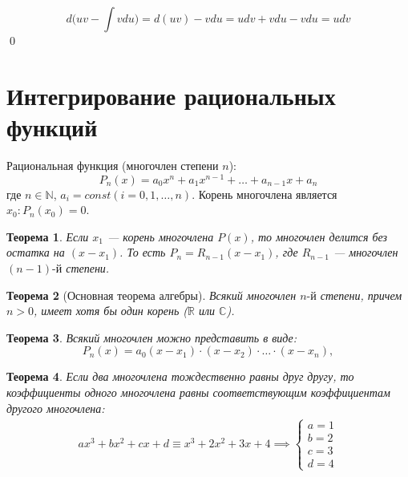 \documentclass[a4paper,12pt,oneside]{extbook}
\theoremstyle{numbered}
\theoremstyle{unnumbered}
\theoremstyle{named}
\newtheorem{theorem}{Теорема}[section]
\theoremstyle{unnumbered}
\theoremstyle{named}
\theoremstyle{named}
\theoremstyle{named}
\renewenvironment{proof}{{\noindent\textsc{Доказательство.}}}{\qed}
\begin{document}
\begin{proof}
    \begin{equation}
        d\Big( uv - \int vdu \Big) = d(uv) - vdu = udv + vdu - vdu = udv
    \end{equation}
\end{proof}


\section{Интегрирование рациональных функций}%
\label{sec:Интегрирование рациональных функций}

Рациональная функция (многочлен степени \(n\)):
\begin{equation}
    P_n(x) = a_0 x^n + a_1 x^{n - 1} + \ldots + a_{n - 1} x + a_n
\end{equation}
где \(n \in \mathbb{N}\), \(a_i = const (i = 0, 1, \ldots, n)\). Корень многочлена является \(x_0: P_n(x_0) = 0\).

\begin{theorem}
    Если \(x_1\) — корень многочлена \(P(x)\), то многочлен делится без остатка на \((x - x_1)\). То есть \(P_n = R_{n - 1}(x - x_1)\), где \(R_{n - 1}\) — многочлен \((n - 1)\text{-й}\) степени.
\end{theorem}


\begin{theorem}[Основная теорема алгебры]
    Всякий многочлен \(n\text{-й}\) степени, причем \(n > 0\), имеет хотя бы один корень (\(\mathbb{R}\) или \(\mathbb{C}\)).
\end{theorem}


\begin{theorem}
    Всякий многочлен можно представить в виде:
    \[
        P_n(x) = a_0 (x - x_1) \cdot (x - x_2) \cdot \ldots \cdot (x - x_n),
    \]
\end{theorem}


\begin{theorem}
    Если два многочлена тождественно равны друг другу, то коэффициенты одного многочлена равны соответствующим коэффициентам другого многочлена:
    \begin{gather*}
        ax^3 + bx^2 + cx + d \equiv x^3 + 2x^2 + 3x + 4
        \implies
        \begin{cases}
            a = 1 \\
            b = 2 \\
            c = 3 \\
            d = 4
        \end{cases}
    \end{gather*}
\end{theorem}
\end{document}
